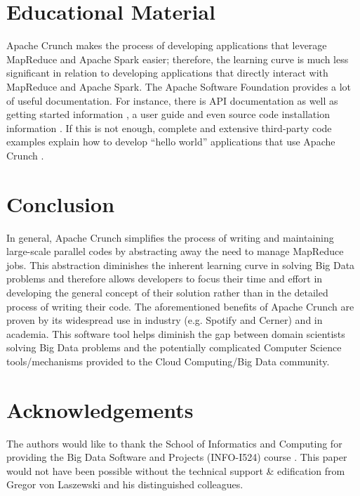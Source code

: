 \documentclass[9pt,twocolumn,twoside]{../../styles/osajnl}
\begin{document}
\section{Educational Material} \label{educational}
Apache Crunch makes the process of developing applications that
leverage MapReduce and Apache Spark easier; therefore, the learning
curve is much less significant in relation to developing applications
that directly interact with MapReduce and Apache Spark. The Apache
Software Foundation provides a lot of useful documentation. For
instance, there is API documentation \cite{www-apache-docs} as well as
getting started information \cite{www-crunch-started}, a user guide
\cite{www-crunch-user-guide} and even source code installation
information \cite{www-crunch-git}. If this is not enough, complete and
extensive third-party code examples explain how to develop ``hello
world'' applications that use Apache Crunch
\cite{www-crunch-tutorial}.

\section{Conclusion} \label{conclusion}
In general, Apache Crunch simplifies the process of writing and
maintaining large-scale parallel codes by abstracting away the need to
manage MapReduce jobs. This abstraction diminishes the inherent
learning curve in solving Big Data problems and therefore allows
developers to focus their time and effort in developing the general
concept of their solution rather than in the detailed process of
writing their code. The aforementioned benefits of Apache Crunch are
proven by its widespread use in industry (e.g. Spotify and Cerner) and
in academia. This software tool helps diminish the gap between domain
scientists solving Big Data problems and the potentially complicated
Computer Science tools/mechanisms provided to the Cloud Computing/Big
Data community.

\section*{Acknowledgements}
The authors would like to thank the School of Informatics and
Computing for providing the Big Data Software and Projects (INFO-I524)
course \cite{www-i524}. This paper would not have been possible
without the technical support \& edification from Gregor von Laszewski
and his distinguished colleagues.

 
\end{document}
